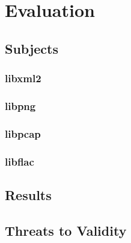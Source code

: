 \section{Evaluation}
\subsection{Subjects}
\subsubsection{libxml2}
\subsubsection{libpng}
\subsubsection{libpcap}
\subsubsection{libflac}
\subsection{Results}
\subsection{Threats to Validity}